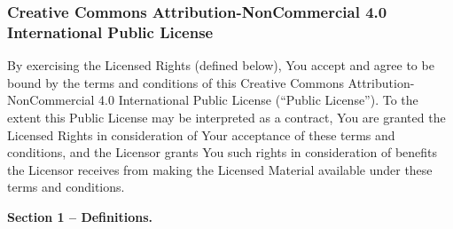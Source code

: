 \subsubsection{Creative Commons Attribution-NonCommercial 4.0 International Public License}
\par By exercising the Licensed Rights (defined below), You accept and agree to be bound by the terms and conditions of this Creative Commons Attribution-NonCommercial 4.0 International Public License (``Public License''). To the extent this Public License may be interpreted as a contract, You are granted the Licensed Rights in consideration of Your acceptance of these terms and conditions, and the Licensor grants You such rights in consideration of benefits the Licensor receives from making the Licensed Material available under these terms and conditions.
\par \textbf{Section 1 – Definitions.}
